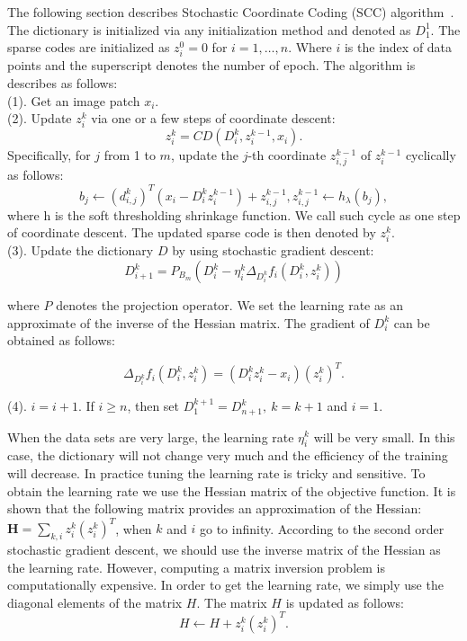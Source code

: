 The following section describes Stochastic Coordinate Coding (SCC) algorithm~\citep{lin2014stochastic}. The dictionary is initialized via any initialization method and denoted as $ D_1^1 $. The sparse codes are initialized as $ z_i^0 = 0 $ for $ i=1,\dots,n $. Where $ i $ is the index of data points and the superscript denotes the number of epoch. The algorithm is describes as follows:\\
(1). Get an image patch $ x_i $.\\
(2). Update $ z_i^k $ via one or a few steps of coordinate descent: 
\begin{equation}
z^k_i = CD(D^k_i,z^{k-1}_i,x_i).
\end{equation}
Specifically, for $ j $ from 1 to $ m $, update the $ j $-th coordinate $ z_{i,j}^{k-1} $ of $ z_{i}^{k-1} $ cyclically as follows:
\begin{equation}
b_j \gets (d_{i,j}^k)^T (x_i - D_i^kz^{k-1}_i) + z^{k-1}_{i,j}, z_{i,j}^{k-1} \gets h_{\lambda}(b_j),
\end{equation}	
where h is the soft thresholding shrinkage function. We call such cycle as one step of coordinate descent. The updated sparse code is then denoted by $ z_i^k $. \\
(3). Update the dictionary $ D $ by using stochastic gradient descent:
\begin{equation}
D_{i+1}^k = P_{B_m}(D_i^k - \eta^k_i\Delta_{D_i^k} f_i(D_i^k,z^k_i))
\end{equation}

where $ P $ denotes the projection operator. We set the learning rate as an approximate of the inverse of the Hessian matrix. The gradient of $ D_i^k $ can be obtained as follows:

\begin{equation}
\Delta_{D_i^k} f_i (D_i^k, z_i^k) = (D^k_iz^k_i - x_i)(z^k_i)^T.
\end{equation}

(4). $ i = i+1 $. If $ i \ge n $, then set $ D_1^{k+1} = D^k_{n+1}, ~k=k+1$ and $ i = 1 $.

When the data sets are very large, the learning rate $ \eta^k_i $ will be very small. In this case, the dictionary will not change very much and the efficiency of the training will decrease. In practice tuning the learning rate is tricky and sensitive. To obtain the learning rate we use the Hessian matrix of the objective function. It is shown that the following matrix provides an approximation of the Hessian: $ \mathbf{H} = \sum_{k,i} z^k_i(z^k_i)^T $, when $ k $ and $ i $ go to infinity. According to the second order stochastic gradient descent, we should use the inverse matrix of the Hessian as the learning rate. However, computing a matrix inversion problem is computationally expensive. In order to get the learning rate, we simply use the diagonal elements of the matrix $ H $. The matrix $ H $ is updated as follows:
\begin{equation}
H \gets H + z^k_i(z^k_i)^T.
\end{equation}

